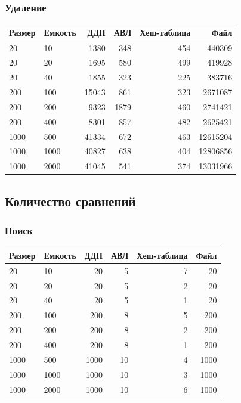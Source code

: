 \documentclass[a4paper,12pt]{extarticle}
\begin{document}
\subsubsection{Удаление}

\begin{tabular}{ |l|l|r|r|r|r| }
\hline
\textbf{Размер} & \textbf{Емкость} & \textbf{ДДП} & \textbf{АВЛ} & \textbf{Хеш-таблица} & \textbf{Файл} \\ \hline
20 & 10 & 1380 & 348 & 454 & 440309 \\ \hline
20 & 20 & 1695 & 580 & 499 & 419928 \\ \hline
20 & 40 & 1855 & 323 & 225 & 383716 \\ \hline
200 & 100 & 15043 & 861 & 323 & 2671087 \\ \hline
200 & 200 & 9323 & 1879 & 460 & 2741421 \\ \hline
200 & 400 & 8301 & 857 & 482 & 2625421 \\ \hline
1000 & 500 & 41334 & 672 & 463 & 12615204 \\ \hline
1000 & 1000 & 40827 & 638 & 404 & 12806856 \\ \hline
1000 & 2000 & 41045 & 541 & 374 & 13031966 \\ \hline



\end{tabular}


\subsection{Количество сравнений}

\subsubsection{Поиск}

\begin{tabular}{ |l|l|r|r|r|r| }
\hline
\textbf{Размер} & \textbf{Емкость} & \textbf{ДДП} & \textbf{АВЛ} & \textbf{Хеш-таблица} & \textbf{Файл} \\ \hline
20 & 10 & 20 & 5 & 7 & 20 \\ \hline
20 & 20 & 20 & 5 & 2 & 20 \\ \hline
20 & 40 & 20 & 5 & 1 & 20 \\ \hline
200 & 100 & 200 & 8 & 5 & 200 \\ \hline
200 & 200 & 200 & 8 & 2 & 200 \\ \hline
200 & 400 & 200 & 8 & 1 & 200 \\ \hline
1000 & 500 & 1000 & 10 & 4 & 1000 \\ \hline
1000 & 1000 & 1000 & 10 & 3 & 1000 \\ \hline
1000 & 2000 & 1000 & 10 & 6 & 1000 \\ \hline



\end{tabular}
\end{document}
